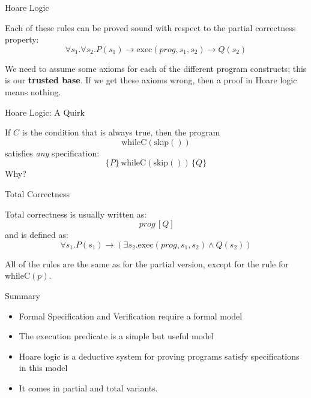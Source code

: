\documentclass[xetex,aspectratio=169,14pt,hyperref={pdfpagelabels=true,pdflang={en-GB}}]{beamer}
\begin{document}
\begin{frame}
  {Hoare Logic}

  Each of these rules can be proved sound with respect to the partial
  correctness property:
  \begin{displaymath}
    \forall s_1. \forall s_2. P(s_1) \to \mathrm{exec}(\mathit{prog},s_1,s_2) \to Q(s_2)
  \end{displaymath}

  \bigskip

  We need to assume some axioms for each of the different program
  constructs; this is our {\bf trusted base}. If we get these axioms
  wrong, then a proof in Hoare logic means nothing.

\end{frame}

\begin{frame}
  {Hoare Logic: A Quirk}

  If $C$ is the condition that is always true, then the program
  \begin{displaymath}
    \mathrm{whileC}(\mathrm{skip}())
  \end{displaymath}
  satisfies \emph{any} specification:
  \begin{displaymath}
    \{ P \}\,\mathrm{whileC}(\mathrm{skip}())\,\{ Q \}
  \end{displaymath}
  Why?
\end{frame}

\begin{frame}
  {Total Correctness}

  Total correctness is usually written as:
  \begin{displaymath}
    [ P ]\,\mathit{prog}\,[ Q ]
  \end{displaymath}
  and is defined as:
  \begin{displaymath}
    \forall s_1. P(s_1) \to (\exists s_2. \mathrm{exec}(\mathit{prog},s_1,s_2) \land Q(s_2))
  \end{displaymath}

  \bigskip

  All of the rules are the same as for the partial version, except for
  the rule for $\mathrm{whileC}(p)$.
\end{frame}

\begin{frame}
  {Summary}

  \begin{itemize}
  \item Formal Specification and Verification require a formal model
  \item The execution predicate is a simple but useful model
  \item Hoare logic is a deductive system for proving programs satisfy specifications in this model
  \item It comes in partial and total variants.
  \end{itemize}
\end{frame}
\end{document}
